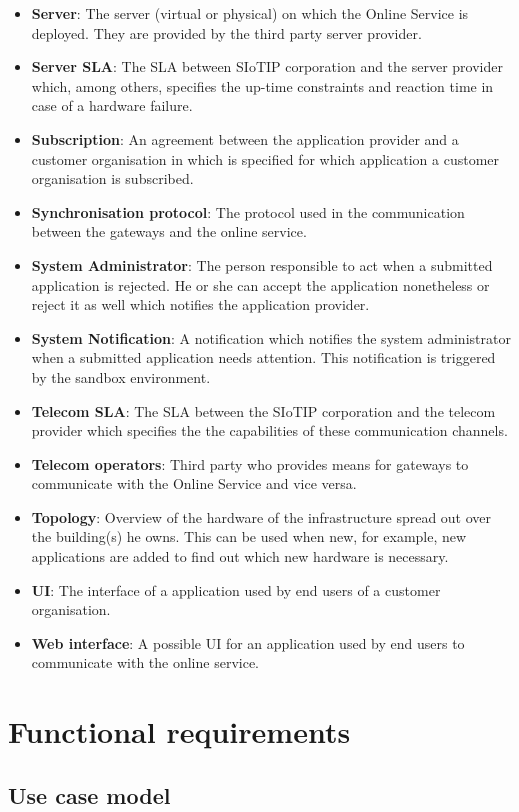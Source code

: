 \documentclass[english]{sareport}
\begin{document}
\begin{itemize}
	\item \textbf{Server}: The server (virtual or physical) on which the Online Service is deployed. They are provided by the third party server provider.
	\item \textbf{Server SLA}: The SLA between SIoTIP corporation and the server provider which, among others, specifies the up-time constraints and reaction time in case of a hardware failure.
	\item \textbf{Subscription}: An agreement between the application provider and a customer organisation in which is specified for which application a customer organisation is subscribed.
	\item \textbf{Synchronisation protocol}: The protocol used in the communication between the gateways and the online service.
	\item \textbf{System Administrator}: The person responsible to act when a submitted application is rejected. He or she can accept the application nonetheless or reject it as well which notifies the application provider.
	\item \textbf{System Notification}: A notification which notifies the system administrator when a submitted application needs attention. This notification is triggered by the sandbox environment.
	\item \textbf{Telecom SLA}: The SLA between the SIoTIP corporation and the telecom provider which specifies the the capabilities of these communication channels.
	\item \textbf{Telecom operators}: Third party who provides means for gateways to communicate with the Online Service and vice versa.
	\item \textbf{Topology}: Overview of the hardware of the infrastructure spread out over the building(s) he owns. This can be used when new, for example, new applications are added to find out which new hardware is necessary.
	\item \textbf{UI}: The interface of a application used by end users of a customer organisation.
	\item \textbf{Web interface}: A possible UI for an application used by end users to communicate with the online service.
\end{itemize}

\chapter{Functional requirements}\label{sec:functional}
\section*{Use case model}
\end{document}
